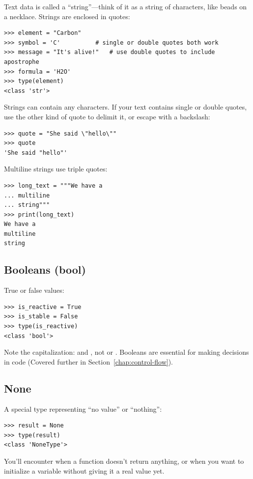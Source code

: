 Text data is called a ``string''---think of it as a string of characters, like beads on a necklace. Strings are enclosed in quotes:

\begin{lstlisting}
>>> element = "Carbon"
>>> symbol = 'C'          # single or double quotes both work
>>> message = "It's alive!"   # use double quotes to include apostrophe
>>> formula = 'H2O'
>>> type(element)
<class 'str'>
\end{lstlisting}

Strings can contain any characters. If your text contains single or double quotes, use the other kind of quote to delimit it, or escape with a backslash:

\begin{lstlisting}
>>> quote = "She said \"hello\""
>>> quote
'She said "hello"'
\end{lstlisting}

Multiline strings use triple quotes:

\begin{lstlisting}
>>> long_text = """We have a
... multiline
... string"""
>>> print(long_text)
We have a
multiline
string
\end{lstlisting}

\subsection{Booleans (bool)}

True or false values:

\begin{lstlisting}
>>> is_reactive = True
>>> is_stable = False
>>> type(is_reactive)
<class 'bool'>
\end{lstlisting}

Note the capitalization:  and , not  or . Booleans are essential for making decisions in code (Covered further in Section~\ref{chap:control-flow}).

\subsection{None}

A special type representing ``no value'' or ``nothing'':

\begin{lstlisting}
>>> result = None
>>> type(result)
<class 'NoneType'>
\end{lstlisting}

You'll encounter  when a function doesn't return anything, or when you want to initialize a variable without giving it a real value yet.


